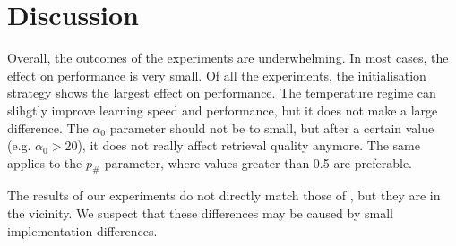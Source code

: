 \section{Discussion}

Overall, the outcomes of the experiments are underwhelming. In most cases, the effect on performance is very small. Of all the experiments, the initialisation strategy shows the largest effect on performance. The temperature regime can slihgtly improve learning speed and performance, but it does not make a large difference. The $\alpha_0$ parameter should not be to small, but after a certain value (e.g. $\alpha_0 > 20$), it does not really affect retrieval quality anymore. The same applies to the $p_\#$ parameter, where values greater than 0.5 are preferable.

The results of our experiments do not directly match those of \cite{Goldwater200921}, but they are in the vicinity. We suspect that these differences may be caused by small implementation differences.

